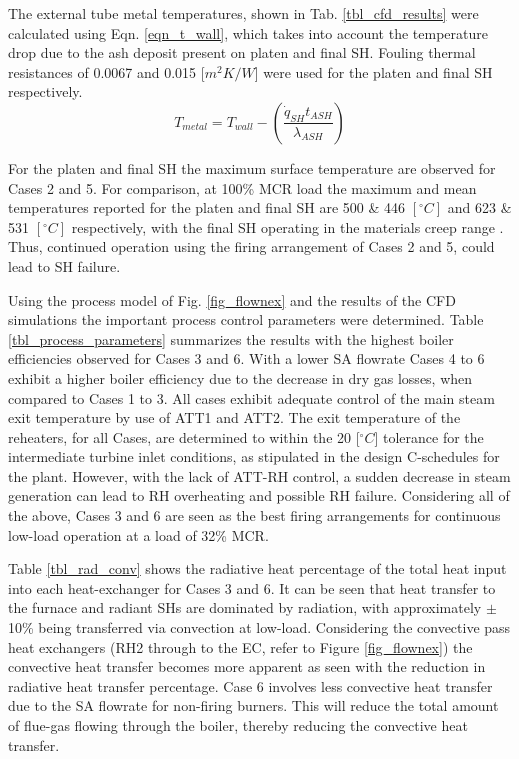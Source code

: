 \documentclass[11pt,cleanfoot]{asme2ej}
\begin{document}
The external tube metal temperatures, shown in Tab. \ref{tbl_cfd_results} were calculated using Eqn. \ref{eqn_t_wall}, which takes into account the temperature drop due to the ash deposit present on platen and final SH. Fouling thermal resistances of 0.0067 and 0.015 [$m^2K/W$] were used for the platen and final SH respectively.
\begin{equation}\label{eqn_t_wall}
T_{metal} = T_{wall} - \left(\frac{\dot{q}_{SH}t_{ASH}}{\lambda_{ASH}}\right)
\end{equation}

For the platen and final SH the maximum surface temperature are observed for Cases 2 and 5. For comparison, at 100\% MCR load the maximum and mean temperatures reported for the platen and final SH are 500 \& 446 $[^\circ C]$ and 623 \& 531 $[^\circ C]$ respectively, with the final SH operating in the materials creep range \cite{Laubscher2019b}. Thus, continued operation using the firing arrangement of Cases 2 and 5, could lead to SH failure.

Using the process model of Fig. \ref{fig_flownex} and the results of the CFD simulations the important process control parameters were determined. Table \ref{tbl_process_parameters} summarizes the results with the highest boiler efficiencies observed for Cases 3 and 6. With a lower SA flowrate Cases 4 to 6 exhibit a higher boiler efficiency due to the decrease in dry gas losses, when compared to Cases 1 to 3. All cases exhibit adequate control of the main steam exit temperature by use of ATT1 and ATT2. The exit temperature of the reheaters, for all Cases, are determined to within the 20 [$^\circ C$] tolerance for the intermediate turbine inlet conditions, as stipulated in the design C-schedules for the plant. However, with the lack of ATT-RH control, a sudden decrease in steam generation can lead to RH overheating and possible RH failure. Considering all of the above, Cases 3 and 6 are seen as the best firing arrangements for continuous low-load operation at a load of 32\% MCR.

Table \ref{tbl_rad_conv} shows the radiative heat percentage of the total heat input into each heat-exchanger for Cases 3 and 6. It can be seen that heat transfer to the furnace and radiant SHs are dominated by radiation, with approximately $\pm$ 10\% being transferred via convection at low-load. Considering the convective pass heat exchangers (RH2 through to the EC, refer to Figure \ref{fig_flownex}) the convective heat transfer becomes more apparent as seen with the reduction in radiative heat transfer percentage. Case 6 involves less convective heat transfer due to the SA flowrate for non-firing burners. This will reduce the total amount of flue-gas flowing through the boiler, thereby reducing the convective heat transfer.
\end{document}
